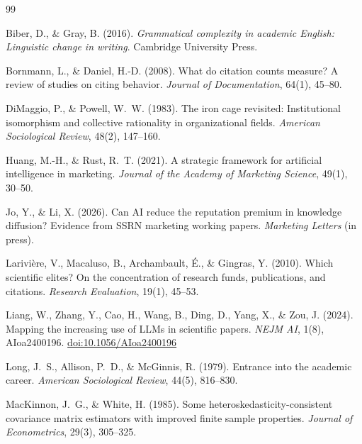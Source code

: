 \documentclass[12pt,a4paper]{article}
\newcommand{\doi}[1]{\href{https://doi.org/#1}{doi:#1}}
\begin{document}

\begin{thebibliography}{99}

Biber, D., \& Gray, B. (2016).
\newblock \textit{Grammatical complexity in academic English: Linguistic change
  in writing}.
\newblock Cambridge University Press.

Bornmann, L., \& Daniel, H.-D. (2008).
\newblock What do citation counts measure? A review of studies on citing
  behavior.
\newblock \textit{Journal of Documentation}, 64(1), 45--80.

DiMaggio, P., \& Powell, W.~W. (1983).
\newblock The iron cage revisited: Institutional isomorphism and collective
  rationality in organizational fields.
\newblock \textit{American Sociological Review}, 48(2), 147--160.

Huang, M.-H., \& Rust, R.~T. (2021).
\newblock A strategic framework for artificial intelligence in marketing.
\newblock \textit{Journal of the Academy of Marketing Science}, 49(1), 30--50.

Jo, Y., \& Li, X. (2026).
\newblock Can AI reduce the reputation premium in knowledge diffusion?
  Evidence from SSRN marketing working papers.
\newblock \textit{Marketing Letters} (in press).

Larivière, V., Macaluso, B., Archambault, É., \& Gingras, Y. (2010).
\newblock Which scientific elites? On the concentration of research funds,
  publications, and citations.
\newblock \textit{Research Evaluation}, 19(1), 45--53.

Liang, W., Zhang, Y., Cao, H., Wang, B., Ding, D., Yang, X.,
  \& Zou, J. (2024).
\newblock Mapping the increasing use of LLMs in scientific papers.
\newblock \textit{NEJM AI}, 1(8), AIoa2400196.
\newblock \doi{10.1056/AIoa2400196}

Long, J.~S., Allison, P.~D., \& McGinnis, R. (1979).
\newblock Entrance into the academic career.
\newblock \textit{American Sociological Review}, 44(5), 816--830.

MacKinnon, J.~G., \& White, H. (1985).
\newblock Some heteroskedasticity-consistent covariance matrix estimators with
  improved finite sample properties.
\newblock \textit{Journal of Econometrics}, 29(3), 305--325.


\end{thebibliography}
\end{document}
